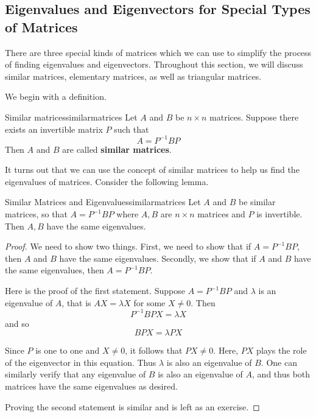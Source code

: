 \subsection{Eigenvalues and Eigenvectors for Special Types of Matrices}

There are three special kinds of matrices which we can use to simplify the process of finding eigenvalues and eigenvectors. 
Throughout this section, we will discuss similar matrices, elementary matrices, as well as triangular matrices. 

We begin with a definition.

\begin{definition}{Similar matrices}{similarmatrices}
Let $A$ and $B$ be $n \times n$ matrices. Suppose there exists an invertible matrix $P$ such that 
\begin{equation*}
A = P^{-1}BP
\end{equation*}
Then $A$ and $B$ are called \textbf{similar matrices}.
\end{definition}

It turns out that we can use the concept of similar matrices to help us find the eigenvalues
of matrices. Consider the following lemma.

\begin{lemma}{Similar Matrices and Eigenvalues}{similarmatrices}
Let $A$ and $B$ be similar matrices, so that $A=P^{-1}BP$ where $A,B$ are $n\times n$ matrices and $P$ is invertible. Then $A,B$ have the
same eigenvalues.
\end{lemma}

\begin{proof}
We need to show two things. First, we need to show that if
$A=P^{-1}BP$, then $A$ and $B$ have the same eigenvalues.  Secondly,
we show that if $A$ and $B$ have the same eigenvalues, then
$A=P^{-1}BP$.

Here is the proof of the first statement. 
Suppose $A = P^{-1}BP$ and $\lambda$ is an eigenvalue of $A$, that is $AX=\lambda X$ for some $X\neq 0.$ Then
\begin{equation*}
P^{-1}BPX=\lambda X
\end{equation*}
and so
\begin{equation*}
BPX=\lambda PX
\end{equation*}

Since $P$ is one to one and $X \neq 0$, it follows that $PX \neq
0$. Here, $PX$ plays the role of the eigenvector in this equation.
Thus $\lambda$ is also an eigenvalue of $B$. One can similarly verify
that any eigenvalue of $B$ is also an eigenvalue of $A$, and thus both
matrices have the same eigenvalues as desired.

Proving the second statement is similar and is left as an exercise. 
\end{proof}

